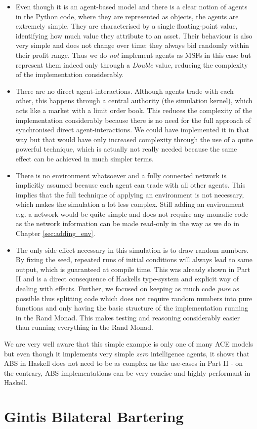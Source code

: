 \begin{itemize}
	\item Even though it is an agent-based model and there is a clear notion of agents in the Python code, where they are represented as objects, the agents are extremely simple. They are characterised by a single floating-point value, identifying how much value they attribute to an asset. Their behaviour is also very simple and does not change over time: they always bid randomly within their profit range. Thus we do \textit{not} implement agents as MSFs in this case but represent them indeed only through a \textit{Double} value, reducing the complexity of the implementation considerably.

	\item There are no direct agent-interactions. Although agents trade with each other, this happens through a central authority (the simulation kernel), which acts like a market with a limit order book. This reduces the complexity of the implementation considerably because there is no need for the full approach of synchronised direct agent-interactions. We could have implemented it in that way but that would have only increased complexity through the use of a quite powerful technique, which is actually not really needed because the same effect can be achieved in much simpler terms.

	\item There is no environment whatsoever and a fully connected network is implicitly assumed because each agent can trade with all other agents. This implies that the full technique of applying an environment is not necessary, which makes the simulation a lot less complex. Still adding an environment e.g. a network would be quite simple and does not require any monadic code as the network information can be made read-only in the way as we do in Chapter \ref{sec:adding_env}.
	
	\item The only side-effect necessary in this simulation is to draw random-numbers. By fixing the seed, repeated runs of initial conditions will always lead to same output, which is guaranteed at compile time. This was already shown in Part II and is a direct consequence of Haskells type-system and explicit way of dealing with effects.	 Further, we focused on keeping as much code \textit{pure} as possible thus splitting code which does not require random numbers into pure functions and only having the basic structure of the implementation running in the Rand Monad. This makes testing and reasoning considerably easier than running everything in the Rand Monad.
\end{itemize}

We are very well aware that this simple example is only one of many ACE models but even though it implements very simple \textit{zero} intelligence agents, it shows that ABS in Haskell does not need to be as complex as the use-cases in Part II - on the contrary, ABS implementations can be very concise and highly performant in Haskell.

\section{Gintis Bilateral Bartering}